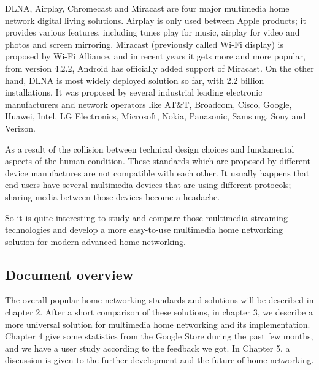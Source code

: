 DLNA, Airplay, Chromecast and Miracast are four major multimedia home network
digital living solutions. Airplay is only used between Apple products; it
provides various features, including tunes play for music, airplay for video
and photos and screen mirroring. Miracast (previously called Wi-Fi display) is
proposed by Wi-Fi Alliance, and in recent years it gets more and more popular,
from version 4.2.2, Android has officially added support of Miracast. On the
other hand, DLNA is most widely deployed solution so far, with 2.2 billion installations.
It was proposed by several industrial leading electronic manufacturers and network operators 
like AT$\&$T, Broadcom, Cisco, Google, Huawei, Intel, LG Electronics, Microsoft, Nokia, 
Panasonic, Samsung, Sony and Verizon.

As a result of the collision between technical design choices and fundamental
aspects of the human condition. These standards which are proposed by different
device manufactures are not compatible with each other. It usually happens that
end-users have several multimedia-devices that are using different protocols;
sharing media between those devices become a headache.

So it is quite interesting to study and compare those multimedia-streaming technologies and 
develop a more easy-to-use multimedia home networking solution for modern advanced home 
networking.

\subsection{Document overview}
The overall popular home networking standards and solutions will be described in
chapter 2. After a short comparison of these solutions, in chapter 3, we
describe a more universal solution for multimedia home networking and its
implementation. Chapter 4 give some statistics from the Google Store
during the past few months, and we have a user study according to the feedback
we got. In Chapter 5, a discussion is given to the further development and the
future of home networking.
